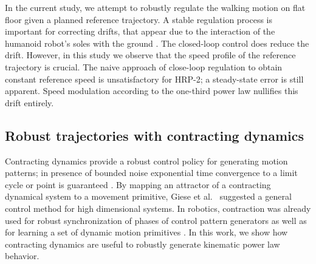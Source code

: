 In the current study, we attempt to robustly regulate the walking motion on flat floor given a planned reference trajectory. A stable regulation process is important for correcting drifts, that appear due to the interaction of the humanoid robot's soles with the ground \cite{stasse:iros:2006}. The closed-loop control does reduce the drift. However, in this study we observe that the speed profile of the reference trajectory is crucial. The naive approach of close-loop regulation to obtain constant reference speed is unsatisfactory for HRP-2; a steady-state error is still apparent. Speed modulation according to the one-third power law nullifies this drift entirely.



\subsection{Robust trajectories with contracting dynamics}
Contracting dynamics provide a robust control policy for generating motion patterns; in presence of bounded noise exponential time convergence to a limit cycle or point is guaranteed \cite{lohmiller_contraction_1998}. By mapping an attractor of a contracting dynamical system to a movement primitive, Giese et al.~\cite{giese_realtime_2009} suggested a general control method for high dimensional systems. In robotics, contraction was already used for robust synchronization of phases of control pattern generators \cite{seo_cpg_2010} as well as for learning a set of dynamic motion primitives \cite{Perk2006}. 
In this work, we show how contracting dynamics are useful to robustly generate kinematic power law behavior. 
